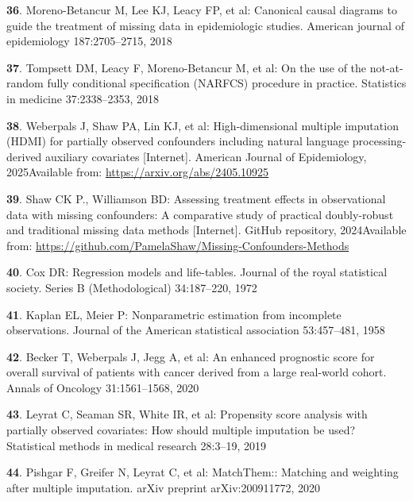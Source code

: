 \documentclass[
  letterpaper,
  DIV=11,
  numbers=noendperiod]{scrartcl}
\newlength{\cslhangindent}
\newenvironment{CSLReferences}[2] %
 {\begin{list}{}{%
  \setlength{\itemindent}{0pt}
  \setlength{\leftmargin}{0pt}
  \setlength{\parsep}{0pt}
  \ifodd #1
   \setlength{\leftmargin}{\cslhangindent}
   \setlength{\itemindent}{-1\cslhangindent}
  \fi
  \setlength{\itemsep}{#2\baselineskip}}}
 {\end{list}}
\begin{document}
\begin{CSLReferences}{0}{1}
\textbf{36}. Moreno-Betancur M, Lee KJ, Leacy FP, et al: Canonical
causal diagrams to guide the treatment of missing data in epidemiologic
studies. American journal of epidemiology 187:2705--2715, 2018

\textbf{37}. Tompsett DM, Leacy F, Moreno-Betancur M, et al: On the use
of the not-at-random fully conditional specification (NARFCS) procedure
in practice. Statistics in medicine 37:2338--2353, 2018

\textbf{38}. Weberpals J, Shaw PA, Lin KJ, et al: High-dimensional
multiple imputation (HDMI) for partially observed confounders including
natural language processing-derived auxiliary covariates {[}Internet{]}.
American Journal of Epidemiology, 2025Available from:
\url{https://arxiv.org/abs/2405.10925}

\textbf{39}. Shaw CK P., Williamson BD: Assessing treatment effects in
observational data with missing confounders: A comparative study of
practical doubly-robust and traditional missing data methods
{[}Internet{]}. GitHub repository, 2024Available from:
\url{https://github.com/PamelaShaw/Missing-Confounders-Methods}

\textbf{40}. Cox DR: Regression models and life-tables. Journal of the
royal statistical society. Series B (Methodological) 34:187--220, 1972

\textbf{41}. Kaplan EL, Meier P: Nonparametric estimation from
incomplete observations. Journal of the American statistical association
53:457--481, 1958

\textbf{42}. Becker T, Weberpals J, Jegg A, et al: An enhanced
prognostic score for overall survival of patients with cancer derived
from a large real-world cohort. Annals of Oncology 31:1561--1568, 2020

\textbf{43}. Leyrat C, Seaman SR, White IR, et al: Propensity score
analysis with partially observed covariates: How should multiple
imputation be used? Statistical methods in medical research 28:3--19,
2019

\textbf{44}. Pishgar F, Greifer N, Leyrat C, et al: MatchThem:: Matching
and weighting after multiple imputation. arXiv preprint arXiv:200911772,
2020


\end{CSLReferences}
\end{document}
